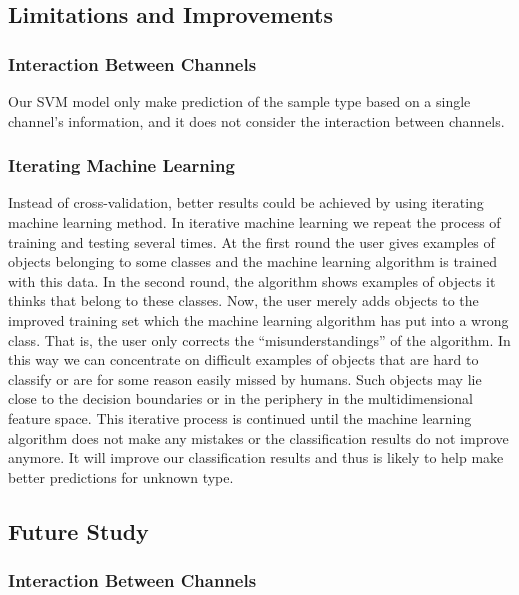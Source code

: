\documentclass[10pt,letterpaper]{article}
\begin{document}
\subsection{Limitations and
Improvements}\label{limitations-and-improvements}

\subsubsection{Interaction Between
Channels}\label{interaction-between-channels}

Our SVM model only make prediction of the sample type based on a single
channel's information, and it does not consider the interaction between
channels.

\subsubsection{Iterating Machine
Learning}\label{iterating-machine-learning}

Instead of cross-validation, better results could be achieved by using
iterating machine learning method. In iterative machine learning we
repeat the process of training and testing several times. At the first
round the user gives examples of objects belonging to some classes and
the machine learning algorithm is trained with this data. In the second
round, the algorithm shows examples of objects it thinks that belong to
these classes. Now, the user merely adds objects to the improved
training set which the machine learning algorithm has put into a wrong
class. That is, the user only corrects the ``misunderstandings'' of the
algorithm. In this way we can concentrate on difficult examples of
objects that are hard to classify or are for some reason easily missed
by humans. Such objects may lie close to the decision boundaries or in
the periphery in the multidimensional feature space. This iterative
process is continued until the machine learning algorithm does not make
any mistakes or the classification results do not improve anymore. It
will improve our classification results and thus is likely to help make
better predictions for unknown type.

\subsection{Future Study}\label{future-study}

\subsubsection{Interaction Between
Channels}\label{interaction-between-channels-1}
\end{document}
